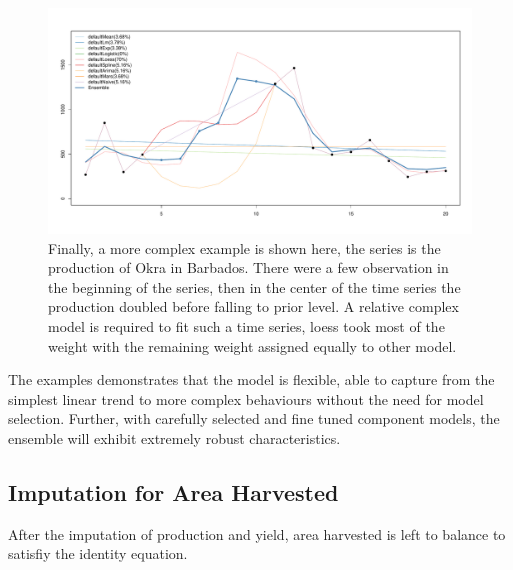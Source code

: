 \documentclass[nojss]{jss}\usepackage[]{graphicx}\usepackage[]{color}
\makeatletter
\def\maxwidth{ %
  \ifdim\Gin@nat@width>\linewidth
    \linewidth
  \else
    \Gin@nat@width
  \fi
}
\newenvironment{knitrout}{}{} %
\makeatother
\begin{document}
\begin{knitrout}
\color{fgcolor}\begin{figure}[!ht]


{\centering \includegraphics[width=\maxwidth]{figure/okra-barbados} 

}

\caption[Finally, a more complex example is shown here, the series is the production of Okra in Barbados]{Finally, a more complex example is shown here, the series is the production of Okra in Barbados. There were a few observation in the beginning of the series, then in the center of the time series the production doubled before falling to prior level. A relative complex model is required to fit such a time series, loess took most of the weight with the remaining weight assigned equally to other model.\label{fig:okra-barbados}}
\end{figure}


\end{knitrout}

\FloatBarrier

The examples demonstrates that the model is flexible, able to capture
from the simplest linear trend to more complex behaviours without the
need for model selection. Further, with carefully selected and fine
tuned component models, the ensemble will exhibit extremely robust
characteristics.


\FloatBarrier
\subsection{Imputation for Area Harvested}

After the imputation of production and yield, area harvested is left
to balance to satisfiy the identity equation.\\
\end{document}
